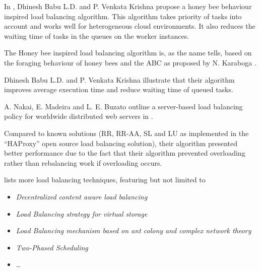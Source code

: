 In \cite{honeybee}, Dhinesh Babu L.D. and P. Venkata Krishna propose a honey bee
behaviour inspired load balancing algorithm.
This algorithm takes priority of tasks into account and works well for
heterogeneous cloud environments.
It also reduces the waiting time of tasks in the queues on the worker instances.

The Honey bee inspired load balancing algorithm is, as the name tells, based on
the foraging behaviour of honey bees and the \ac{ABC} as proposed by
N. Karaboga \cite{honeybee}.

Dhinesh Babu L.D. and P. Venkata Krishna illustrate that their algorithm
improves average execution time and reduce waiting time of queued tasks.

A. Nakai, E. Madeira and L. E. Buzato outline a server-based load balancing
policy for worldwide distributed web servers in \cite{nakai}.

Compared to known solutions (\ac{RR}, \ac{RR-AA}, \ac{SL} and \ac{LU} as
implemented in the ``HAProxy'' open source load balancing solution), their
algorithm presented better performance due to the fact that their algorithm
prevented overloading rather than rebalancing work if overloading occurs.

\cite{cloudLBTech} lists more load balancing techniques, featuring but not
limited to
\begin{itemize}
    \item \emph{Decentralized content aware load balancing}
    \item \emph{Load Balancing strategy for virtual storage}
    \item \emph{Load Balancing mechanism based on ant colony and complex network
        theory}
    \item \emph{Two-Phased Scheduling}
    \item \dots
\end{itemize}

